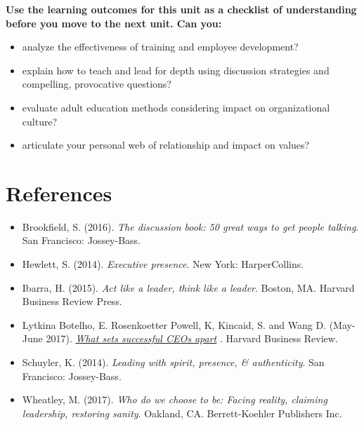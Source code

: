\documentclass[
]{book}
\providecommand{\tightlist}{%
  \setlength{\itemsep}{0pt}\setlength{\parskip}{0pt}}
\begin{document}
\begin{progress}
\textbf{Use the learning outcomes for this unit as a checklist of understanding before you move to the next unit. Can you:}

\begin{itemize}
\tightlist
\item
  analyze the effectiveness of training and employee development?\\
\item
  explain how to teach and lead for depth using discussion strategies and compelling, provocative questions?\\
\item
  evaluate adult education methods considering impact on organizational culture?\\
\item
  articulate your personal web of relationship and impact on values?
\end{itemize}
\end{progress}

\hypertarget{references-3}{%
\section*{References}\label{references-3}}

\begin{itemize}
\tightlist
\item
  Brookfield, S. (2016). \emph{The discussion book: 50 great ways to get people talking}. San Francisco: Jossey-Bass.\\
\item
  Hewlett, S. (2014). \emph{Executive presence}. New York: HarperCollins.\\
\item
  Ibarra, H. (2015). \emph{Act like a leader, think like a leader}. Boston, MA. Harvard Business Review Press.\\
\item
  Lytkina Botelho, E. Rosenkoetter Powell, K, Kincaid, S. and Wang D. (May-June 2017). \href{https://hbr.org/2017/05/what-sets-successful-ceos-apart}{\emph{What sets successful CEOs apart}} . Harvard Business Review.\\
\item
  Schuyler, K. (2014). \emph{Leading with spirit, presence, \& authenticity}. San Francisco: Jossey-Bass.\\
\item
  Wheatley, M. (2017). \emph{Who do we choose to be: Facing reality, claiming leadership, restoring sanity}. Oakland, CA. Berrett-Koehler Publishers Inc.~
\end{itemize}
\end{document}
